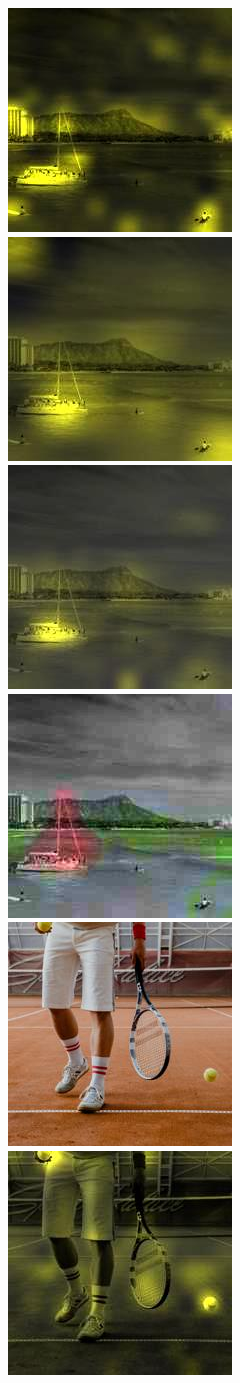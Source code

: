 \begin{figure}[t]
         \includegraphics[width = 0.19\linewidth]{figs/attention_fig_main/gray_vit_S_attention_mean_pexels-jess-vide-4319846.jpg} \hfill
        \includegraphics[width = 0.19\linewidth]{figs/attention_fig_main/gray_resnet50_attention_mean_pexels-jess-vide-4319846.jpg} \hfill
         \includegraphics[width = 0.19\linewidth]{figs/attention_fig_main/gray_S60_attention_mean_pexels-jess-vide-4319846.jpg} \hfill
         \includegraphics[width = 0.19\linewidth]{figs/attention_fig_main/gray_attn_multi_pexels-jess-vide-4319846.jpg}\\%
        \includegraphics[width = 0.19\linewidth]{figs/attention_fig_main/pexels-cottonbro-5739196.jpg} \hfill
         \includegraphics[width = 0.19\linewidth]{figs/attention_fig_main/gray_vit_S_attention_mean_pexels-cottonbro-5739196.jpg} \hfill

\end{figure}
